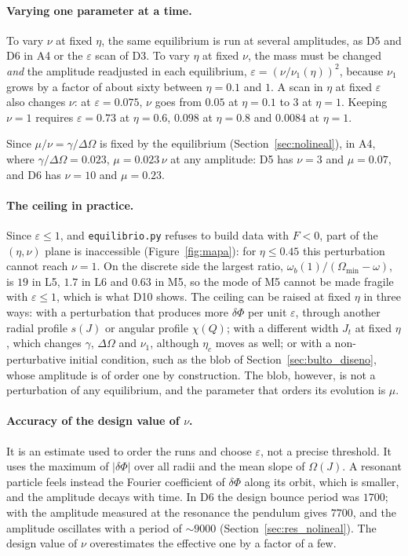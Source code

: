 \documentclass[11pt,a4paper]{article}
\begin{document}
\paragraph{Varying one parameter at a time.} To vary $\nu$ at fixed $\eta$, the same
equilibrium is run at several amplitudes, as D5 and D6 in A4 or the $\varepsilon$ scan of
D3. To vary $\eta$ at fixed $\nu$, the mass must be changed \emph{and} the amplitude
readjusted in each equilibrium, $\varepsilon=(\nu/\nu_1(\eta))^2$, because $\nu_1$ grows by
a factor of about sixty between $\eta=0.1$ and $1$. A scan in $\eta$ at fixed
$\varepsilon$ also changes $\nu$: at $\varepsilon=0.075$, $\nu$ goes from $0.05$ at
$\eta=0.1$ to $3$ at $\eta=1$. Keeping $\nu=1$ requires $\varepsilon=0.73$ at $\eta=0.6$,
$0.098$ at $\eta=0.8$ and $0.0084$ at $\eta=1$.

Since $\mu/\nu=\gamma/\Delta\Omega$ is fixed by the equilibrium (Section~\ref{sec:nolineal}),
in A4, where $\gamma/\Delta\Omega=0.023$, $\mu=0.023\,\nu$ at any amplitude: D5 has $\nu=3$
and $\mu=0.07$, and D6 has $\nu=10$ and $\mu=0.23$.

\paragraph{The ceiling in practice.} Since $\varepsilon\le1$, and \texttt{equilibrio.py}
refuses to build data with $F<0$, part of the $(\eta,\nu)$ plane is inaccessible
(Figure~\ref{fig:mapa}): for $\eta\le0.45$ this perturbation cannot reach $\nu=1$. On the
discrete side the largest ratio, $\omega_b(1)/(\Omega_{\min}-\omega)$, is $19$ in L5, $1.7$ in
L6 and $0.63$ in M5, so the mode of M5 cannot be made fragile with $\varepsilon\le1$,
which is what D10 shows.
The ceiling can be raised at fixed $\eta$ in three ways: with a perturbation that
produces more $\delta\Phi$ per unit $\varepsilon$, through another radial profile $s(J)$
or angular profile $\chi(Q)$; with a different width $J_t$ at fixed $\eta$, which changes
$\gamma$, $\Delta\Omega$ and $\nu_1$, although $\eta_c$ moves as well; or with a
non-perturbative initial condition, such as the blob of Section~\ref{sec:bulto_diseno}, whose
amplitude is of order one by construction. The blob, however, is not a perturbation
of any equilibrium, and the parameter that orders its evolution is $\mu$.

\paragraph{Accuracy of the design value of $\nu$.} It is an estimate used to order the
runs and choose $\varepsilon$, not a precise threshold. It uses the maximum of
$|\delta\Phi|$ over all radii and the mean slope of $\Omega(J)$. A resonant particle
feels instead the Fourier coefficient of $\delta\Phi$ along its orbit, which is smaller,
and the amplitude decays with time. In D6 the design bounce period was $1700$; with the
amplitude measured at the resonance the pendulum gives $7700$, and the amplitude
oscillates with a period of $\sim9000$ (Section~\ref{sec:res_nolineal}). The design
value of $\nu$ overestimates the effective one by a factor of a few.
\end{document}
